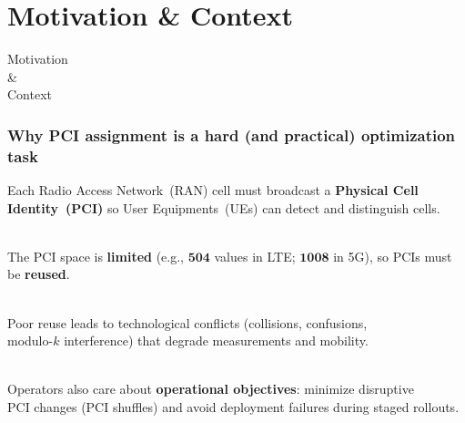 \documentclass[
	11pt, %
	aspectratio=169, %
]{beamer}
\begin{document}
\section{Motivation \& Context}

\begin{frame}[plain]
\begin{center}
{\Huge Motivation \\ \& \\ Context}
\end{center}
\end{frame}

\begin{frame}
\frametitle{Why PCI assignment is a hard (and practical) optimization task}

Each Radio Access Network~(RAN) cell must broadcast a \textbf{Physical Cell Identity~(PCI)} so User Equipments~(UEs) can detect and distinguish cells.

~\\

The PCI space is \textbf{limited} (e.g., $\mathbf{504}$ values in LTE; $\mathbf{1008}$ in 5G), so PCIs must be \textbf{reused}.

~\\

Poor reuse leads to technological conflicts (collisions, confusions, \\
modulo-$k$ interference) that degrade measurements and mobility.

~\\

Operators also care about \textbf{operational objectives}: minimize disruptive \\
PCI changes (PCI shuffles) and avoid deployment failures during staged rollouts.

\end{frame}
\end{document}
